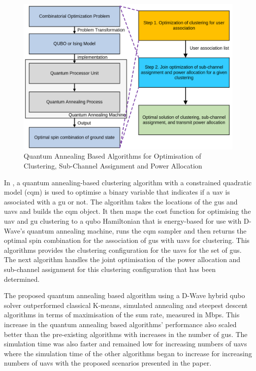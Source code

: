 \begin{figure}[ht]
    \centering
    \includegraphics[width=1\textwidth]{figures/quantum_annealing_uav_algorithm.png}
    \caption{Quantum Annealing Based Algorithms for Optimisation of Clustering, Sub-Channel Assignment and Power Allocation}
    \label{fig:quantum_annealing_uav_jeong}
\end{figure}
In \cite{jeong_quantum_2025}, a quantum annealing-based clustering algorithm with a constrained quadratic model (\acrshort{cqm}) is used to optimise a binary variable that indicates if a \acrshort{uav} is associated with a \acrshort{gu} or not. 
The algorithm takes the locations of the \acrshort{gu}s and \acrshort{uav}s and builds the \acrshort{cqm} object. It then maps the cost function for optimising the \acrshort{uav} and \acrshort{gu} clustering to a \acrshort{qubo} Hamiltonian that is energy-based for use with D-Wave's quantum annealing machine, runs the \acrshort{cqm} sampler and then returns the optimal spin combination for the association of \acrshort{gu}s with \acrshort{uav}s for clustering. 
This algorithms provides the clustering configuration for the \acrshort{uav}s for the set of \acrshort{gu}s. 
The next algorithm handles the joint optimisation of the power allocation and sub-channel assignment for this clustering configuration that has been determined. 

The proposed quantum annealing based algorithm using a D-Wave hybrid \acrshort{qubo} solver outperformed classical K-means, simulated annealing \cite{kirkpatrick_optimization_nodate} and steepest descent \cite{battiti_first-_1992} algorithms in terms of maximisation of the sum rate, measured in Mbps. 
This increase in the quantum annealing based algorithms' performance also scaled better than the pre-existing algorithms with increases in the number of \acrshort{gu}s. 
The simulation time was also faster and remained low for increasing numbers of \acrshort{uav}s where the simulation time of the other algorithms began to increase for increasing numbers of \acrshort{uav}s with the proposed scenarios presented in the paper.

